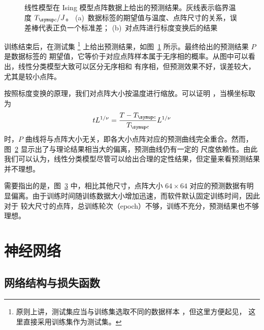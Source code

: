 \begin{figure}[htb]
  \centering
  \begin{subfigure}[b]{0.47\textwidth}
    \centering
    \label{fig:ising-learning-linear}
  \end{subfigure}
  \begin{subfigure}[b]{0.47\textwidth}
    \centering
    \label{fig:ising-learning-linear-scaled}
  \end{subfigure}
  \caption{线性模型在 Ising 模型点阵数据上给出的预测结果。灰线表示临界温度 $\Tc/J$。
    (a)~数据标签的期望值与温度、点阵尺寸的关系，误差棒代表正负一个标准差；
    (b)~对点阵进行标度变换后的结果}
  \label{fig:ising-learning-linear-total}
\end{figure}

训练结束后，在测试集
\footnote{原则上讲，测试集应当与训练集选取不同的数据样本 \cite{zhouzhihua}，但这里方便起见，
  这里直接采用训练集作为测试集。}
上给出预测结果，如图~\ref{fig:ising-learning-linear} 所示。最终给出的预测结果 $P$ 是数据标签的
期望值，它等价于对应点阵样本属于无序相的概率。从图中可以看出，线性分类模型大致可以区分无序相和
有序相，但预测效果不好，误差较大，尤其是较小点阵。

按照标度变换的原理，我们对点阵大小按温度进行缩放。可以证明 \cite{phase}，当横坐标取为
\begin{equation}
  tL^{1/\nu} = \frac{T-\Tc}{\Tc} L^{1/\nu}
\end{equation}
时，$P$ 曲线将与点阵大小无关，即各大小点阵对应的预测曲线完全重合。然而，
图~\ref{fig:ising-learning-linear-scaled} 显示出了与理论结果相当大的偏离，预测曲线仍有一定的
尺度依赖性。由此我们可以认为，线性分类模型尽管可以给出合理的定性结果，但定量来看预测结果并不理想。

需要指出的是，图~\ref{fig:ising-learning-linear-total} 中，相比其他尺寸，点阵大小 $64 \times 64$
对应的预测数据有明显偏离。由于训练时间随训练数据大小增加迅速，而软件默认固定训练时间，因此对于
较大尺寸的点阵，总训练轮次（epoch）不够，训练不充分，预测结果也不够理想。

\section{神经网络}

\subsection{网络结构与损失函数}

